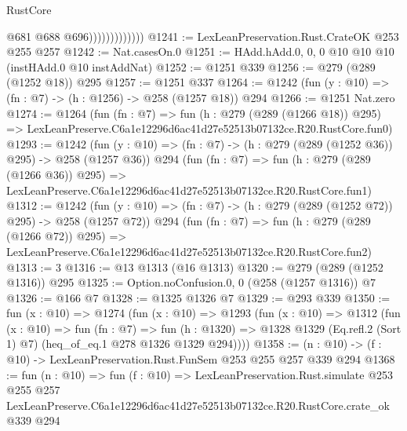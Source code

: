 \begin{lexlean}{RustCore}
\begin{coremodule}
                              @681
                              @688
                              @696)))))))))))))
@1241 := LexLeanPreservation.Rust.CrateOK @253 @255 @257
@1242 := Nat.casesOn.{0}
@1251 := HAdd.hAdd.{0, 0, 0} @10 @10 @10 (instHAdd.{0} @10 instAddNat)
@1252 := @1251 @339
@1256 := @279 (@289 (@1252 @18)) @295
@1257 := @1251 @337
@1264 := @1242 (fun (y : @10) => (fn : @7) -> (h : @1256) -> @258 (@1257 @18)) @294
@1266 := @1251 Nat.zero
@1274 := @1264
    (fun (fn : @7) =>
    fun (h : @279 (@289 (@1266 @18)) @295) =>
    LexLeanPreserve.C6a1e12296d6ac41d27e52513b07132ce.R20.RustCore.fun0)
@1293 := @1242
    (fun (y : @10) => (fn : @7) -> (h : @279 (@289 (@1252 @36)) @295) -> @258 (@1257 @36))
    @294
    (fun (fn : @7) =>
    fun (h : @279 (@289 (@1266 @36)) @295) =>
    LexLeanPreserve.C6a1e12296d6ac41d27e52513b07132ce.R20.RustCore.fun1)
@1312 := @1242
    (fun (y : @10) => (fn : @7) -> (h : @279 (@289 (@1252 @72)) @295) -> @258 (@1257 @72))
    @294
    (fun (fn : @7) =>
    fun (h : @279 (@289 (@1266 @72)) @295) =>
    LexLeanPreserve.C6a1e12296d6ac41d27e52513b07132ce.R20.RustCore.fun2)
@1313 := 3
@1316 := @13 @1313 (@16 @1313)
@1320 := @279 (@289 (@1252 @1316)) @295
@1325 := Option.noConfusion.{0, 0} (@258 (@1257 @1316)) @7
@1326 := @166 @7
@1328 := @1325 @1326 @7
@1329 := @293 @339
@1350 := fun (x : @10) =>
  @1274
    (fun (x : @10) =>
    @1293
      (fun (x : @10) =>
      @1312
        (fun (x : @10) =>
        fun (fn : @7) =>
        fun (h : @1320) =>
        @1328 @1329 (Eq.refl.{2} (Sort 1) @7) (heq_of_eq.{1} @278 @1326 @1329 @294))))
@1358 := (n : @10) -> (f : @10) -> LexLeanPreservation.Rust.FunSem @253 @255 @257 @339 @294
@1368 := fun (n : @10) =>
  fun (f : @10) =>
  LexLeanPreservation.Rust.simulate
    @253
    @255
    @257
    LexLeanPreserve.C6a1e12296d6ac41d27e52513b07132ce.R20.RustCore.crate_ok
    @339
    @294
\end{coremodule}
\end{lexlean}
